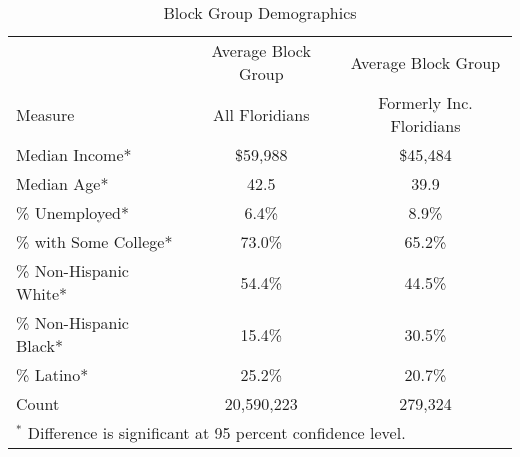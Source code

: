 \begin{table}[H]
\fontsize{10}{12}\selectfont

\caption{\label{tab:demos} Block Group Demographics}
\centering
\begin{tabular}[t]{lcc}
\toprule
&Average Block Group&Average Block Group\\
Measure &All Floridians&Formerly Inc. Floridians\\
\midrule
Median Income* & \$59,988 & \$45,484\\
Median Age* & 42.5 & 39.9\\
\% Unemployed* & 6.4\% & 8.9\%\\
\% with Some College* & 73.0\% & 65.2\%\\
\% Non-Hispanic White* & 54.4\% & 44.5\%\\
\% Non-Hispanic Black* & 15.4\% & 30.5\%\\
\% Latino* & 25.2\% & 20.7\%\\
\midrule
Count & 20,590,223 & 279,324\\
\bottomrule
\multicolumn{3}{l}{\scriptsize{\parbox{.5\linewidth}{\vspace{2pt}$^*$ Difference is significant at 95 percent confidence level.}}}
\end{tabular}
\end{table}
